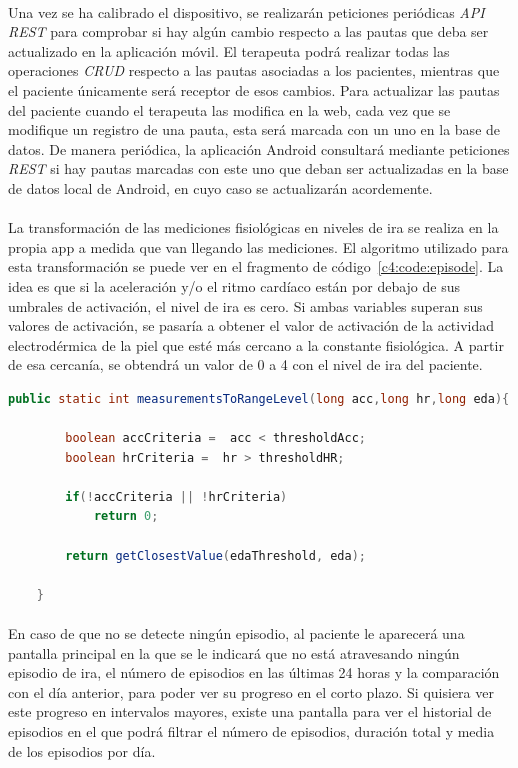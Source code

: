\paragraph{}
Una vez se ha calibrado el dispositivo, se realizarán peticiones periódicas \textit{API REST} para comprobar si hay algún cambio respecto a las pautas que deba ser actualizado en la aplicación móvil. El terapeuta podrá realizar todas las operaciones \textit{CRUD} respecto a las pautas asociadas a los pacientes, mientras que el paciente únicamente será receptor de esos cambios. Para actualizar las pautas del paciente cuando el terapeuta las modifica en la web, cada vez que se modifique un registro de una pauta, esta será marcada con un uno en la base de datos. De manera periódica, la aplicación Android consultará mediante peticiones \textit{REST} si hay pautas marcadas con este uno que deban ser actualizadas en la base de datos local de Android, en cuyo caso se actualizarán acordemente.

\paragraph{}
La transformación de las mediciones fisiológicas en niveles de ira se realiza en la propia app a medida que van llegando las mediciones. El algoritmo utilizado para esta transformación se puede ver en el fragmento de código~\ref{c4:code:episode}. La idea es que si la aceleración y/o el ritmo cardíaco están por debajo de sus umbrales de activación, el nivel de ira es cero. Si ambas variables superan sus valores de activación, se pasaría a obtener el valor de activación de la actividad electrodérmica de la piel que esté más cercano a la constante fisiológica. A partir de esa cercanía, se obtendrá un valor de 0 a 4 con el nivel de ira del paciente.


\begin{lstlisting}[language=Java, caption=Obtención del nivel de ira, label=c4:code:episode, stepnumber=1]
    public static int measurementsToRangeLevel(long acc,long hr,long eda){

        boolean accCriteria =  acc < thresholdAcc;
        boolean hrCriteria =  hr > thresholdHR;

        if(!accCriteria || !hrCriteria)
            return 0;

        return getClosestValue(edaThreshold, eda);

    }
\end{lstlisting}


\paragraph{}
En caso de que no se detecte ningún episodio, al paciente le aparecerá una pantalla principal en la que se le indicará que no está atravesando ningún episodio de ira, el número de episodios en las últimas 24 horas y la comparación con el día anterior, para poder ver su progreso en el corto plazo. Si quisiera ver este progreso en intervalos mayores, existe una pantalla para ver el historial de episodios en el que podrá filtrar el número de episodios, duración total y media de los episodios por día.

